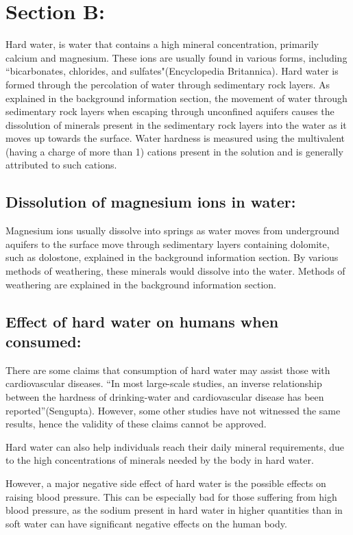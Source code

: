 \documentclass[11pt, a4]{article}
\begin{document}
			
			

	\section{Section B:}
		Hard water, is water that contains a high mineral concentration, primarily calcium and magnesium. These ions are usually found in various forms, including ``bicarbonates, chlorides, and sulfates"(Encyclopedia Britannica). Hard water is formed through the percolation of water through sedimentary rock layers. As explained in the background information section, the movement of water through sedimentary rock layers when escaping through unconfined aquifers causes the dissolution of minerals present in the sedimentary rock layers into the water as it moves up towards the surface. Water hardness is measured using the multivalent (having a charge of more than 1) cations present in the solution and is generally attributed to such cations.
		\subsection{Dissolution of magnesium ions in water:}

			Magnesium ions usually dissolve into springs as water moves from underground aquifers to the surface move through sedimentary layers containing dolomite, such as dolostone, explained in the background information section. By various methods of weathering, these minerals would dissolve into the water. Methods of weathering are explained in the background information section.
		
		\subsection{Effect of hard water on humans when consumed:}
			
			There are some claims that consumption of hard water may assist those with cardiovascular diseases. ``In most large-scale studies, an inverse relationship between the hardness of drinking-water and cardiovascular disease has been reported''(Sengupta). However, some other studies have not witnessed the same results, hence the validity of these claims cannot be approved.

			Hard water can also help individuals reach their daily mineral requirements, due to the high concentrations of minerals needed by the body in hard water.

			However, a major negative side effect of hard water is the possible effects on raising blood pressure. This can be especially bad for those suffering from high blood pressure, as the sodium present in hard water in higher quantities than in soft water can have significant negative effects on the human body.
\end{document}
